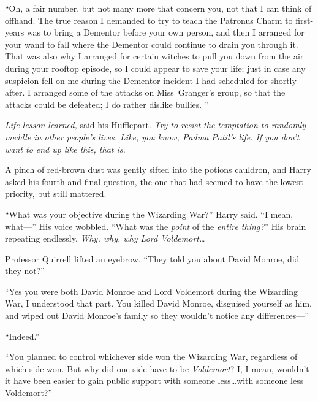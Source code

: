 “Oh, a fair number, but not many more that concern you, not that I can think of offhand. The true reason I demanded to try to teach the Patronus Charm to first-years was to bring a Dementor before your own person, and then I arranged for your wand to fall where the Dementor could continue to drain you through it.  That was also why I arranged for certain witches to pull you down from the air during your rooftop episode, so I could appear to save your life; just in case any suspicion fell on me during the Dementor incident I had scheduled for shortly after.  I arranged some of the attacks on Miss~Granger’s group, so that the attacks could be defeated; I do rather dislike bullies. ”

\emph{Life lesson learned,} said his Hufflepart. \emph{Try to resist the temptation to randomly meddle in other people’s lives. Like, you know, Padma Patil’s life. If you don’t want to end up like this, that is.}

A pinch of red-brown dust was gently sifted into the potions cauldron, and Harry asked his fourth and final question, the one that had seemed to have the lowest priority, but still mattered.

“What was your objective during the Wizarding War?” Harry said. “I mean, what—” His voice wobbled. “What was the \emph{point} of the \emph{entire thing?}” His brain repeating endlessly, \emph{Why, why, why Lord Voldemort…}

Professor Quirrell lifted an eyebrow. “They told you about David Monroe, did they not?”

“Yes you were both David Monroe and Lord Voldemort during the Wizarding War, I understood that part. You killed David Monroe, disguised yourself as him, and wiped out David Monroe’s family so they wouldn’t notice any differences—”

“Indeed.”

“You planned to control whichever side won the Wizarding War, regardless of which side won. But why did one side have to be \emph{Voldemort}? I, I mean, wouldn’t it have been easier to gain public support with someone less…with someone less Voldemort?”

